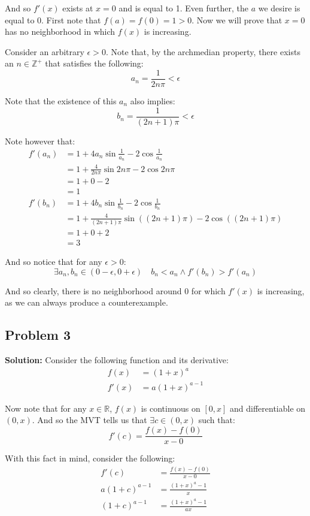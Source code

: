 \documentclass{article}
\newcommand{\R}{\mathbb R}
\newcommand{\Z}{\mathbb Z}
\begin{document}
And so $f'(x)$ exists at $x=0$ and is equal to 1. Even further, the $a$ we desire is equal to 0. First note that $f(a)=f(0)=1>0$. Now we will prove that $x=0$ has no neighborhood in which $f(x)$ is increasing.

Consider an arbitrary $\epsilon>0$. Note that, by the archmedian property, there exists an $n\in\Z^+$ that satisfies the following:
$$a_n=\frac{1}{2n\pi}<\epsilon$$

Note that the existence of this $a_n$ also implies:
$$b_n=\frac{1}{(2n+1)\pi}<\epsilon$$

Note however that:
\begin{align*}
  f'(a_n)&=1+4a_n\sin\frac{1}{a_n}-2\cos\frac{1}{a_n}\tag{derivative of $f(x)$}\\
  &=1+\frac{4}{2n\pi}\sin2n\pi-2\cos2n\pi\tag{def. of $a_n$}\\
  &=1+0-2\\
  &=1\\
  f'(b_n)&=1+4b_n\sin\frac{1}{b_n}-2\cos\frac{1}{b_n}\tag{derivative of $f(x)$}\\
  &=1+\frac{4}{(2n+1)\pi}\sin((2n+1)\pi)-2\cos((2n+1)\pi)\tag{def. of $b_n$}\\
  &=1+0+2\\
  &=3
\end{align*}

And so notice that for any $\epsilon>0$:
$$\exists a_n,b_n\in(0-\epsilon,0+\epsilon)\quad b_n<a_n\wedge f'(b_n)>f'(a_n)$$

And so clearly, there is no neighborhood around 0 for which $f'(x)$ is increasing, as we can always produce a counterexample.

\subsection*{Problem 3}
\noindent\textbf{Solution:} Consider the following function and its derivative:
\begin{align*}
  f(x)&=(1+x)^a\\
  f'(x)&=a(1+x)^{a-1}
\end{align*}

Now note that for any $x\in\R$, $f(x)$ is continuous on $[0,x]$ and differentiable on $(0,x)$. And so the MVT tells us that $\exists c\in(0,x)$ such that:
$$f'(c)=\frac{f(x)-f(0)}{x-0}$$

With this fact in mind, consider the following:
\begin{align*}
  f'(c)&=\frac{f(x)-f(0)}{x-0}\tag{MVT}\\
  a(1+c)^{a-1}&=\frac{(1+x)^a-1}{x}\tag{def. of $f$ and $f'$}\\
  (1+c)^{a-1}&=\frac{(1+x)^a-1}{ax}
\end{align*}
\end{document}
